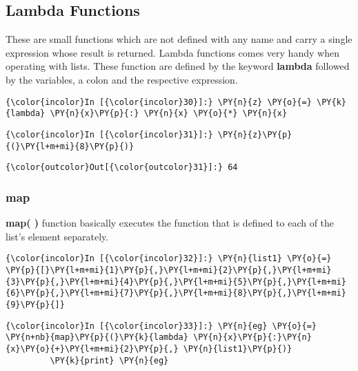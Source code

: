     \subsection{Lambda Functions}\label{lambda-functions}

    These are small functions which are not defined with any name and carry
a single expression whose result is returned. Lambda functions comes
very handy when operating with lists. These function are defined by the
keyword \textbf{lambda} followed by the variables, a colon and the
respective expression.

    \begin{Verbatim}[commandchars=\\\{\}]
{\color{incolor}In [{\color{incolor}30}]:} \PY{n}{z} \PY{o}{=} \PY{k}{lambda} \PY{n}{x}\PY{p}{:} \PY{n}{x} \PY{o}{*} \PY{n}{x}
\end{Verbatim}

    \begin{Verbatim}[commandchars=\\\{\}]
{\color{incolor}In [{\color{incolor}31}]:} \PY{n}{z}\PY{p}{(}\PY{l+m+mi}{8}\PY{p}{)}
\end{Verbatim}

            \begin{Verbatim}[commandchars=\\\{\}]
{\color{outcolor}Out[{\color{outcolor}31}]:} 64
\end{Verbatim}
        
    \subsubsection{map}\label{map}

    \textbf{map( )} function basically executes the function that is defined
to each of the list's element separately.

    \begin{Verbatim}[commandchars=\\\{\}]
{\color{incolor}In [{\color{incolor}32}]:} \PY{n}{list1} \PY{o}{=} \PY{p}{[}\PY{l+m+mi}{1}\PY{p}{,}\PY{l+m+mi}{2}\PY{p}{,}\PY{l+m+mi}{3}\PY{p}{,}\PY{l+m+mi}{4}\PY{p}{,}\PY{l+m+mi}{5}\PY{p}{,}\PY{l+m+mi}{6}\PY{p}{,}\PY{l+m+mi}{7}\PY{p}{,}\PY{l+m+mi}{8}\PY{p}{,}\PY{l+m+mi}{9}\PY{p}{]}
\end{Verbatim}

    \begin{Verbatim}[commandchars=\\\{\}]
{\color{incolor}In [{\color{incolor}33}]:} \PY{n}{eg} \PY{o}{=} \PY{n+nb}{map}\PY{p}{(}\PY{k}{lambda} \PY{n}{x}\PY{p}{:}\PY{n}{x}\PY{o}{+}\PY{l+m+mi}{2}\PY{p}{,} \PY{n}{list1}\PY{p}{)}
         \PY{k}{print} \PY{n}{eg}
\end{Verbatim}

